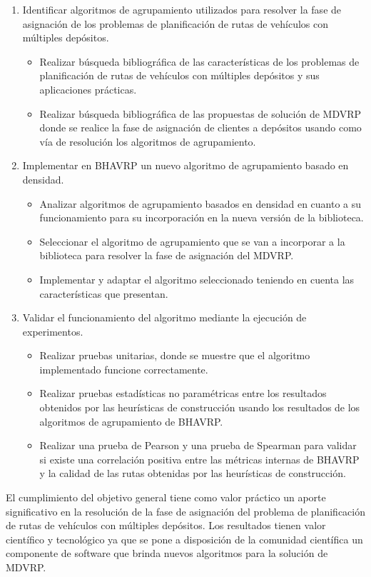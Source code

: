 \begin{enumerate}
  \item Identificar algoritmos de agrupamiento utilizados para resolver la fase de asignación de los problemas de planificación de rutas de vehículos con múltiples depósitos.
  \begin{itemize}
    \item Realizar búsqueda bibliográfica de las características de los problemas de planificación de rutas de vehículos con múltiples depósitos y sus aplicaciones prácticas.
    \item Realizar búsqueda bibliográfica de las propuestas de solución de MDVRP donde se realice la fase de asignación de clientes a depósitos usando como vía de resolución los algoritmos de agrupamiento.
  \end{itemize}
  \item Implementar en BHAVRP un nuevo algoritmo de agrupamiento basado en densidad.
  \begin{itemize}
    \item Analizar algoritmos de agrupamiento basados en densidad en cuanto a su funcionamiento para su incorporación en la nueva versión de la biblioteca.
    \item Seleccionar el algoritmo de agrupamiento que se van a incorporar a la biblioteca para resolver la fase de asignación del MDVRP.
    \item Implementar y adaptar el algoritmo seleccionado teniendo en cuenta las características que presentan.
  \end{itemize}
  \item Validar el funcionamiento del algoritmo mediante la ejecución  de experimentos.
  \begin{itemize}
    \item Realizar pruebas unitarias, donde se muestre que el algoritmo implementado funcione correctamente.
    \item Realizar pruebas estadísticas no paramétricas entre los resultados obtenidos por las heurísticas de construcción usando los resultados de los algoritmos de agrupamiento de BHAVRP.
    \item Realizar una prueba de Pearson y una prueba de Spearman para validar si existe una correlación positiva entre las métricas internas de BHAVRP y la calidad de las rutas obtenidas por las heurísticas de construcción.
  \end{itemize}
\end{enumerate}

El cumplimiento del objetivo general tiene como valor práctico un aporte significativo en la resolución de la fase de asignación del problema de planificación de rutas de vehículos con múltiples depósitos. Los resultados tienen valor científico y tecnológico ya que se pone a disposición de la comunidad científica un componente de software que brinda nuevos algoritmos para la solución de MDVRP.

